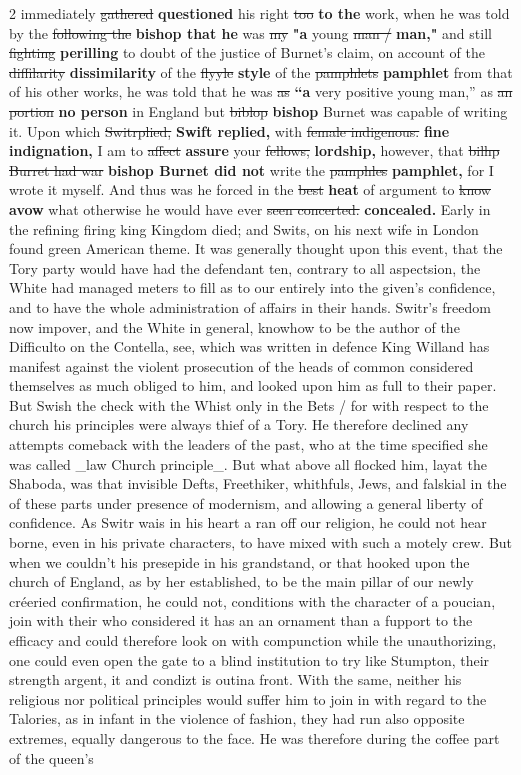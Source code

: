 \documentclass[10pt]{article}
\begin{document}
\begin{multicols}{2}
immediately \sout{gathered} \textbf{questioned} his right \sout{too} \textbf{to the} work, when he was told by the \sout{following the} \textbf{bishop that he} was \sout{my} \textbf{"a} young \sout{man /} \textbf{man,"} and still \sout{fighting} \textbf{perilling} to doubt of the justice of Burnet's claim, on account of the \sout{diffilarity} \textbf{dissimilarity} of the \sout{flyyle} \textbf{style} of the \sout{pamphlets} \textbf{pamphlet} from that of his other works, he was told that he was \sout{as} \textbf{“a} very positive young man,” as \sout{an portion} \textbf{no person} in England but \sout{biblop} \textbf{bishop} Burnet was capable of writing it. Upon which \sout{Switrplied,} \textbf{Swift replied,} with \sout{female indigenous.} \textbf{fine indignation,} I am to \sout{affect} \textbf{assure} your \sout{fellows,} \textbf{lordship,} however, that \sout{bilhp Burret had war} \textbf{bishop Burnet did not} write the \sout{pamphles} \textbf{pamphlet,} for I wrote it myself. And thus was he forced in the \sout{best} \textbf{heat} of argument to \sout{know} \textbf{avow} what otherwise he would have ever \sout{seen concerted.} \textbf{concealed.} Early in the refining firing king Kingdom died; and Swits, on his next wife in London found green American theme. It was generally thought upon this event, that the Tory party would have had the defendant ten, contrary to all aspectsion, the White had managed meters to fill as to our entirely into the given’s confidence, and to have the whole administration of affairs in their hands. Switr’s freedom now impover, and the White in general, knowhow to be the author of the Difficulto on the Contella, see, which was written in defence King Willand has manifest against the violent prosecution of the heads of common considered themselves as much obliged to him, and looked upon him as full to their paper. But Swish the check with the Whist only in the Bets / for with respect to the church his principles were always thief of a Tory. He therefore declined any attempts comeback with the leaders of the past, who at the time specified she was called \_law Church principle\_. But what above all flocked him, layat the Shaboda, was that invisible Defts, Freethiker, whithfuls, Jews, and falskial in the of these parts under presence of modernism, and allowing a general liberty of confidence. As Switr wais in his heart a ran off our religion, he could not hear borne, even in his private characters, to have mixed with such a motely crew. But when we couldn't his presepide in his grandstand, or that hooked upon the church of England, as by her established, to be the main pillar of our newly créeried confirmation, he could not, conditions with the character of a poucian, join with their who considered it has an an ornament than a fupport to the efficacy and could therefore look on with compunction while the unauthorizing, one could even open the gate to a blind institution to try like Stumpton, their strength argent, it and condizt is outina front. With the same, neither his religious nor political principles would suffer him to join in with regard to the Talories, as in infant in the violence of fashion, they had run also opposite extremes, equally dangerous to the face. He was therefore during the coffee part of the queen’s 
\end{multicols}
\end{document}
